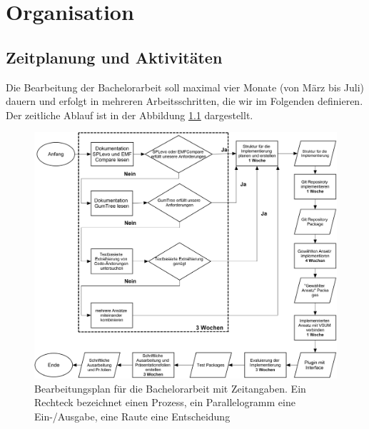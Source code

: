 \chapter{Organisation}
\label{ch:Organisation}

\section{Zeitplanung und Aktivitäten}
Die Bearbeitung der Bachelorarbeit soll maximal vier Monate (von März bis Juli) dauern und erfolgt in mehreren Arbeitsschritten, die wir im Folgenden definieren. Der zeitliche Ablauf ist in der Abbildung \ref{fig:arbeitsschritte} dargestellt.

\begin{figure}[h]
\includegraphics[width=\textwidth]{pictures/Zeitplan.png}
\caption{Bearbeitungsplan für die Bachelorarbeit mit Zeitangaben. Ein Rechteck bezeichnet einen Prozess, ein Parallelogramm eine Ein-/Ausgabe, eine Raute eine Entscheidung}
\label{fig:arbeitsschritte}
\end{figure}

